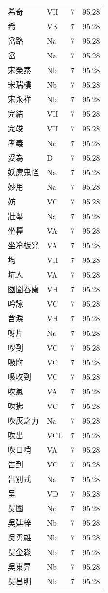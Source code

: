 \documentclass[twocolumn]{book}
\begin{document}
\begin{supertabular}{llrr}
希奇 & VH & 7 &  95.28\\
希 & VK & 7 &  95.28\\
岔路 & Na & 7 &  95.28\\
岔 & Na & 7 &  95.28\\
宋榮泰 & Nb & 7 &  95.28\\
宋瑞樓 & Nb & 7 &  95.28\\
宋永祥 & Nb & 7 &  95.28\\
完結 & VH & 7 &  95.28\\
完竣 & VH & 7 &  95.28\\
孝義 & Nc & 7 &  95.28\\
妥為 & D & 7 &  95.28\\
妖魔鬼怪 & Na & 7 &  95.28\\
妙用 & Na & 7 &  95.28\\
妨 & VC & 7 &  95.28\\
壯舉 & Na & 7 &  95.28\\
坐檯 & VA & 7 &  95.28\\
坐冷板凳 & VA & 7 &  95.28\\
均 & VH & 7 &  95.28\\
坑人 & VA & 7 &  95.28\\
囫圇吞棗 & VH & 7 &  95.28\\
吟詠 & VC & 7 &  95.28\\
含淚 & VH & 7 &  95.28\\
呀片 & Na & 7 &  95.28\\
吵到 & VC & 7 &  95.28\\
吸附 & VC & 7 &  95.28\\
吸收到 & VC & 7 &  95.28\\
吹氣 & VA & 7 &  95.28\\
吹拂 & VC & 7 &  95.28\\
吹灰之力 & Na & 7 &  95.28\\
吹出 & VCL & 7 &  95.28\\
吹口哨 & VA & 7 &  95.28\\
告到 & VC & 7 &  95.28\\
告別式 & Na & 7 &  95.28\\
呈 & VD & 7 &  95.28\\
吳國 & Nc & 7 &  95.28\\
吳建梓 & Nb & 7 &  95.28\\
吳勇雄 & Nb & 7 &  95.28\\
吳金淼 & Nb & 7 &  95.28\\
吳東昇 & Nb & 7 &  95.28\\
吳昌明 & Nb & 7 &  95.28\\

\end{supertabular}
\end{document}
